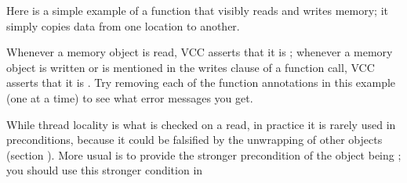Here is a simple example of a function that visibly reads and writes
memory; it simply copies data from one location to another.



Whenever a memory object is read, VCC asserts that it is
; whenever a memory object is written or is
mentioned in the writes clause of a function call, VCC asserts that it
is . Try removing each of the function annotations in
this example (one at a time) to see what error messages you get.

While thread locality is what is checked on a read, in practice it is
rarely used in preconditions, because it could be falsified by the
unwrapping of other objects (section ). 
More usual is to provide the stronger precondition of the object being
\vcc{\unwrapped}; you should use this stronger condition in 



